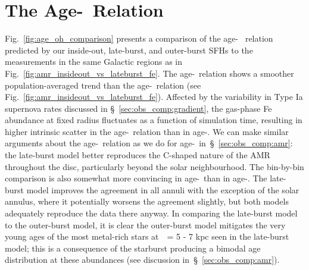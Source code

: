 \documentclass[draft2.tex]{subfiles}
\begin{document}
 

\section{The Age-\oh~Relation} 
\label{sec:age_oh_relation} 

Fig.~\ref{fig:age_oh_comparison} presents a comparison of the age-\oh~ 
relation predicted by our inside-out, late-burst, and outer-burst SFHs to 
the~\citet{Feuillet2019} measurements in the same Galactic regions as in 
Fig.~\ref{fig:amr_insideout_vs_lateburst_fe}. 
The age-\oh~relation shows a smoother population-averaged trend than the 
age-\feh~relation (see Fig.~\ref{fig:amr_insideout_vs_lateburst_fe}). 
Affected by the variability in Type Ia supernova rates discussed in 
\S~\ref{sec:obs_comp:gradient}, the gas-phase Fe abundance at fixed radius 
fluctuates as a function of simulation time, resulting in higher intrinsic 
scatter in the age-\feh~relation than in age-\oh. 
We can make similar arguments about the age-\oh~relation as we do for 
age-\feh~in~\S~\ref{sec:obs_comp:amr}: the late-burst model better reproduces 
the C-shaped nature of the AMR throughout the disc, particularly beyond the 
solar neighbourhood. 
The bin-by-bin comparison is also somewhat more convincing in age-\oh~than in 
age-\feh. 
The late-burst model improves the agreement in all annuli with the exception of 
the solar annulus, where it potentially worsens the agreement slightly, but 
both models adequately reproduce the data there anyway. 
In comparing the late-burst model to the outer-burst model, it is clear the 
outer-burst model mitigates the very young ages of the most metal-rich stars 
at~\rgal~= 5 - 7 kpc seen in the late-burst model; this is a consequence of 
the starburst producing a bimodal age distribution at these abundances (see 
discussion in~\S~\ref{sec:obs_comp:amr}). 
\end{document}
